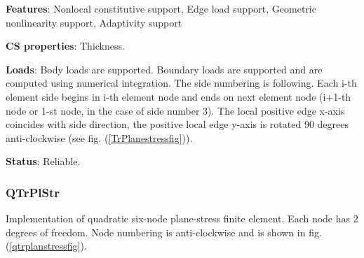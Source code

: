 \documentclass[a4paper]{article}
\newcommand{\descitem}[1]{{\noindent \bf #1}:}
\begin{document}
\descitem{Features} Nonlocal constitutive support, Edge load
support, Geometric nonlinearity support, Adaptivity support

\descitem{CS properties} Thickness. 

\descitem{Loads} Body loads are supported. Boundary loads are
supported and are computed  using numerical integration. The side numbering is
following. Each i-th element side begins in i-th element node and
ends on next element node (i+1-th node or 1-st node, in the case of 
side number 3). The local positive edge x-axis coincides with side
direction, the positive local edge y-axis is rotated 90 degrees
anti-clockwise (see fig. (\ref{TrPlanestressfig})).

\descitem{Status} Reliable.

\subsubsection{QTrPlStr}
Implementation of quadratic six-node plane-stress finite
element. Each node has 2 degrees of freedom. Node numbering is
anti-clockwise and is shown in fig. (\ref{qtrplanstressfig}).
\end{document}
